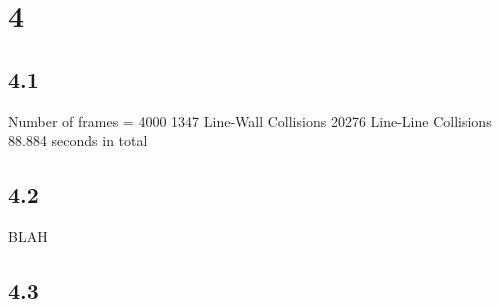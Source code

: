 \documentclass[12pt]{article}
\begin{document}
\maketitle
\section{4}
\subsection{4.1}
Number of frames = 4000
1347 Line-Wall Collisions
20276 Line-Line Collisions
88.884 seconds in total

\subsection{4.2}
BLAH

\subsection{4.3}
\end{document}

